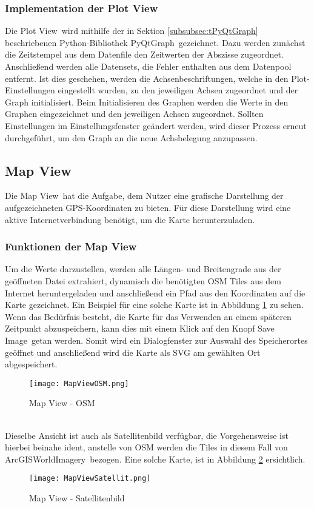 \subsubsection{Implementation der Plot View}
\label{subsubsec:PlotViewImplementation}
Die \glqq Plot View\grqq\ wird mithilfe der in Sektion \ref{subsubsec:tPyQtGraph} beschriebenen Python-Bibliothek \glqq PyQtGraph\grqq \ gezeichnet. Dazu werden zunächst die Zeitstempel aus dem Datenfile den Zeitwerten der Abszisse zugeordnet. Anschließend werden alle Datensets, die Fehler enthalten aus dem Datenpool entfernt. Ist dies geschehen, werden die Achsenbeschriftungen, welche in den Plot-Einstellungen eingestellt wurden, zu den jeweiligen Achsen zugeordnet und der Graph initialisiert. Beim Initialisieren des Graphen werden die Werte in den Graphen eingezeichnet und den jeweiligen Achsen zugeordnet. Sollten Einstellungen im Einstellungsfenster geändert werden, wird dieser Prozess erneut durchgeführt, um den Graph an die neue Achsbelegung anzupassen.
\subsection{Map View}
\label{subsec:VisMapView}
Die \glqq Map View\grqq\ hat die Aufgabe, dem Nutzer eine grafische Darstellung der aufgezeichneten \ac{GPS}-Koordinaten zu bieten. Für diese Darstellung wird eine aktive Internetverbindung benötigt, um die Karte herunterzuladen.
\subsubsection{Funktionen der Map View}
\label{subsubsec:MapViewFunktion}
Um die Werte darzustellen, werden alle Längen- und Breitengrade aus der geöffneten Datei extrahiert, dynamisch die benötigten \ac{OSM} Tiles aus dem Internet heruntergeladen und anschließend ein Pfad aus den Koordinaten auf die Karte gezeichnet. Ein Beispiel für eine solche Karte ist in Abbildung 
\ref{fig:OSMMapView} zu sehen. Wenn das Bedürfnis besteht, die Karte für das Verwenden an einem späteren Zeitpunkt abzuspeichern, kann dies mit einem Klick auf den Knopf \glqq Save Image\grqq\ getan werden. Somit wird ein Dialogfenster zur Auswahl des Speicherortes geöffnet und anschließend wird die Karte als \ac{SVG} am gewählten Ort abgespeichert.
\begin{figure}[h]
\centering
\texttt{[image: MapViewOSM.png]}
\caption{Map View - \ac{OSM}}
\label{fig:OSMMapView}
\end{figure}
\\
Dieselbe Ansicht ist auch als Satellitenbild verfügbar, die Vorgehensweise ist hierbei beinahe ident, anstelle von \ac{OSM} werden die Tiles in diesem Fall von \glqq ArcGISWorldImagery\grqq\ bezogen. Eine solche Karte, ist in Abbildung \ref{fig:SatteliteMapView} ersichtlich. 
\begin{figure}[h]
\centering
\texttt{[image: MapViewSatellit.png]}
\caption{Map View - Satellitenbild}
\label{fig:SatteliteMapView}
\end{figure}

